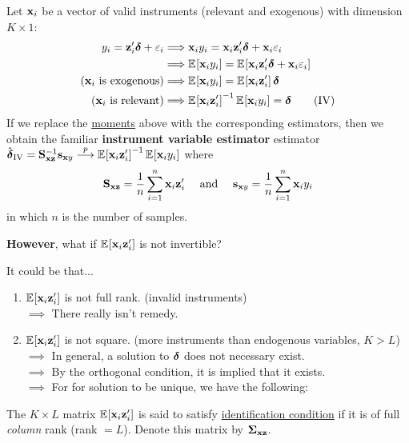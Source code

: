 \documentclass{beamer}
\begin{document}
\begin{frame}{}
	Let $\mathbf{x}_i$ be a vector of valid instruments (relevant and exogenous) with dimension $K\times1$:
	\begin{align*}
		y_i = \mathbf{z}_i'\boldsymbol{\delta} + \varepsilon_i
		&\Longrightarrow \mathbf{x}_i y_i = \mathbf{x}_i \mathbf{z}_i' \boldsymbol{\delta} + \mathbf{x}_i \varepsilon_i \\
		&\Longrightarrow \operatorname{\mathbb{E}}_{}\!\left[\mathbf{x}_i y_i\right] = \operatorname{\mathbb{E}}_{}\!\left[\mathbf{x}_i \mathbf{z}_i' \boldsymbol{\delta} + \mathbf{x}_i \varepsilon_i\right] \\
		\text{($\mathbf{x}_i$ is exogenous)} &\Longrightarrow \operatorname{\mathbb{E}}_{}\!\left[\mathbf{x}_i y_i\right] = \operatorname{\mathbb{E}}_{}\!\left[\mathbf{x}_i \mathbf{z}_i'\right]\boldsymbol{\delta} \\
		\text{($\mathbf{x}_i$ is relevant)}  &\Longrightarrow \operatorname{\mathbb{E}}_{}\!\left[\mathbf{x}_i\mathbf{z}_i'\right]^{-1}\operatorname{\mathbb{E}}_{}\!\left[\mathbf{x}_i y_i\right] = \boldsymbol{\delta} \tag{IV}
	\end{align*}
	If we replace the \underline{moments} above with the corresponding estimators,
	then we obtain the familiar \textbf{instrument variable estimator}
	estimator $\hat{\boldsymbol{\delta}}_{\text{IV}}=\mathbf{S}_{\mathbf{x}\mathbf{z}}^{-1}\mathbf{s}_{\mathbf{x} y}\overset{p}{\longrightarrow}\operatorname{\mathbb{E}}_{}\!\left[\mathbf{x}_i\mathbf{z}_i'\right]^{-1}\operatorname{\mathbb{E}}_{}\!\left[\mathbf{x}_i y_i\right]$ where
	\begin{align*}
		\mathbf{S}_{\mathbf{x}\mathbf{z}} = \frac1n\sum_{i=1}^{n} \mathbf{x}_i\mathbf{z}_i' \quad\text{ and }\quad
		\mathbf{s}_{\mathbf{x} y} = \frac1n\sum_{i=1}^{n} \mathbf{x}_iy_i
	\end{align*}
	in which $n$ is the number of samples.
\end{frame}

\begin{frame}{}
	\begin{block}{}
		\textbf{However}, what if $\operatorname{\mathbb{E}}_{}\!\left[\mathbf{x}_i\mathbf{z}_i'\right]$ is not invertible?
	\end{block}
	It could be that...
	\begin{enumerate}
		\item $\operatorname{\mathbb{E}}_{}\!\left[\mathbf{x}_i\mathbf{z}_i'\right]$ is not full rank. (invalid instruments) \\
			$\implies$ There really isn't remedy.
		\item $\operatorname{\mathbb{E}}_{}\!\left[\mathbf{x}_i\mathbf{z}_i'\right]$ is not square. (more instruments than endogenous variables, $K>L$) \\
			$\implies$ In general, a solution to $\boldsymbol{\delta}$ does not necessary exist. \\
			$\implies$ By the orthogonal condition, it is implied that it exists. \\
			$\implies$ For for solution to be unique, we have the following:
	\end{enumerate}
	\begin{definition}[Identification]
		The $K\times L$ matrix $\operatorname{\mathbb{E}}_{}\!\left[\mathbf{x}_i\mathbf{z}_i'\right]$
		is said to satisfy \underline{identification condition} if
		it is of full \emph{column} rank (rank $=L$).
		Denote this matrix by $\boldsymbol{\Sigma}_{\mathbf{x}\mathbf{z}}$.
	\end{definition}
\end{frame}
\end{document}
